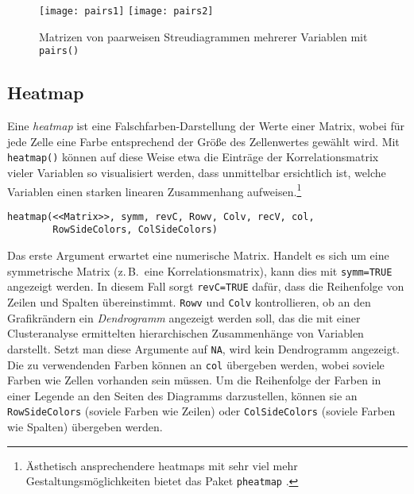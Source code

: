 \begin{figure}[ht]
\centering
\texttt{[image: pairs1]}
\texttt{[image: pairs2]}
\vspace*{-1em}
\caption{Matrizen von paarweisen Streudiagrammen mehrerer Variablen mit \lstinline!pairs()!}
\label{fig:pairs}
\end{figure}

\subsection{Heatmap}
\label{sec:heatmap}

Eine \emph{heatmap} ist eine Falschfarben-Darstellung der Werte einer Matrix, wobei für jede Zelle eine Farbe entsprechend der Größe des Zellenwertes gewählt wird. Mit \lstinline!heatmap()! können auf diese Weise etwa die Einträge der Korrelationsmatrix vieler Variablen so visualisiert werden, dass unmittelbar ersichtlich ist, welche Variablen einen starken linearen Zusammenhang aufweisen.\footnote{Ästhetisch ansprechendere heatmaps mit sehr viel mehr Gestaltungsmöglichkeiten bietet das Paket  \lstinline!pheatmap! \cite{Kolde2015}.}
\begin{lstlisting}
heatmap(<<Matrix>>, symm, revC, Rowv, Colv, recV, col,
        RowSideColors, ColSideColors)
\end{lstlisting}

Das erste Argument erwartet eine numerische Matrix. Handelt es sich um eine symmetrische Matrix (z.\,B.\ eine Korrelationsmatrix), kann dies mit \lstinline!symm=TRUE! angezeigt werden. In diesem Fall sorgt \lstinline!revC=TRUE! dafür, dass die Reihenfolge von Zeilen und Spalten übereinstimmt. \lstinline!Rowv! und \lstinline!Colv! kontrollieren, ob an den Grafikrändern ein \emph{Dendrogramm} angezeigt werden soll, das die mit einer Clusteranalyse ermittelten hierarchischen Zusammenhänge von Variablen darstellt. Setzt man diese Argumente auf \lstinline!NA!, wird kein Dendrogramm angezeigt. Die zu verwendenden Farben können an \lstinline!col! übergeben werden, wobei soviele Farben wie Zellen vorhanden sein müssen. Um die Reihenfolge der Farben in einer Legende an den Seiten des Diagramms darzustellen, können sie an \lstinline!RowSideColors! (soviele Farben wie Zeilen) oder \lstinline!ColSideColors! (soviele Farben wie Spalten) übergeben werden.

